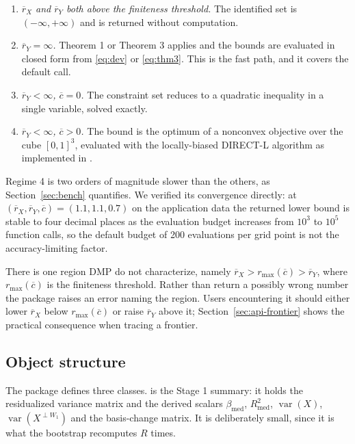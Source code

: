 \documentclass[article]{jss}\usepackage[]{graphicx}\usepackage[]{xcolor}
\newcommand{\bmed}{\beta_{\mathrm{med}}}
\newcommand{\rxbar}{\ensuremath{\overline{r}_X}}
\newcommand{\rybar}{\ensuremath{\overline{r}_Y}}
\newcommand{\cbar}{\ensuremath{\overline{c}}}
\newcommand{\Var}{\operatorname{var}}
\begin{document}
\begin{enumerate}
\item \emph{$\rxbar$ and $\rybar$ both above the finiteness threshold.}
The identified set is $(-\infty, +\infty)$ and is returned without
computation.
\item \emph{$\rybar = \infty$.} Theorem 1 or Theorem 3 applies and the
bounds are evaluated in closed form from \eqref{eq:dev} or
\eqref{eq:thm3}. This is the fast path, and it covers the default call.
\item \emph{$\rybar < \infty$, $\cbar = 0$.} The constraint set reduces to
a quadratic inequality in a single variable, solved exactly.
\item \emph{$\rybar < \infty$, $\cbar > 0$.} The bound is the optimum of a
nonconvex objective over the cube $[0,1]^3$, evaluated with the
locally-biased DIRECT-L algorithm \citep{Jones1993,Gablonsky2001} as
implemented in  \citep{nloptr,Johnson2024}.
\end{enumerate}

Regime 4 is two orders of magnitude slower than the others, as
Section~\ref{sec:bench} quantifies. We verified its convergence directly:
at $(\rxbar, \rybar, \cbar) = (1.1, 1.1, 0.7)$ on the application data the
returned lower bound is stable to four decimal places as the evaluation
budget increases from $10^3$ to $10^5$ function calls, so the default
budget of 200 evaluations per grid point is not the accuracy-limiting
factor.

There is one region DMP do not characterize, namely
$\rxbar > r_{\max}(\cbar) > \rybar$, where $r_{\max}(\cbar)$ is the
finiteness threshold. Rather than return a possibly wrong number the
package raises an error naming the region. Users encountering it should
either lower $\rxbar$ below $r_{\max}(\cbar)$ or raise $\rybar$ above it;
Section~\ref{sec:api-frontier} shows the practical consequence when
tracing a frontier.

\subsection{Object structure}\label{sec:objects}

The package defines three classes.  is the Stage 1
summary: it holds the residualized variance matrix and the derived scalars
$\bmed$, $R^2_{\mathrm{med}}$, $\Var(X)$, $\Var(X^{\perp W_1})$ and the
basis-change matrix. It is deliberately small, since it is what the
bootstrap recomputes $R$ times.
\end{document}
